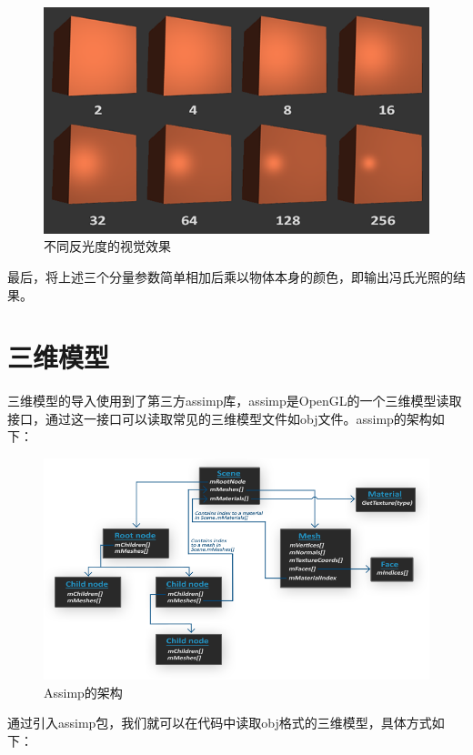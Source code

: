 \begin{spacing}{2.5}
    \begin{figure}[H]
    	\centering
		\includegraphics[width=1.0\textwidth]{images/shininess.png}
		\caption{不同反光度的视觉效果}
		\label{shininess}
    \end{figure}
    
    最后，将上述三个分量参数简单相加后乘以物体本身的颜色，即输出冯氏光照的结果。
    	
    \end{spacing}
  

    \section{三维模型}

        \begin{spacing}{2.5}
    三维模型的导入使用到了第三方assimp库，assimp是OpenGL的一个三维模型读取接口，通过这一接口可以读取常见的三维模型文件如obj文件。assimp的架构如下：
    \begin{figure}[H]
    	\centering
		\includegraphics[width=1.0\textwidth]{images/assimp.png}
		\caption{Assimp的架构}
		\label{shininess}
    \end{figure}
    
    
    通过引入assimp包，我们就可以在代码中读取obj格式的三维模型，具体方式如下：
        \end{spacing}

